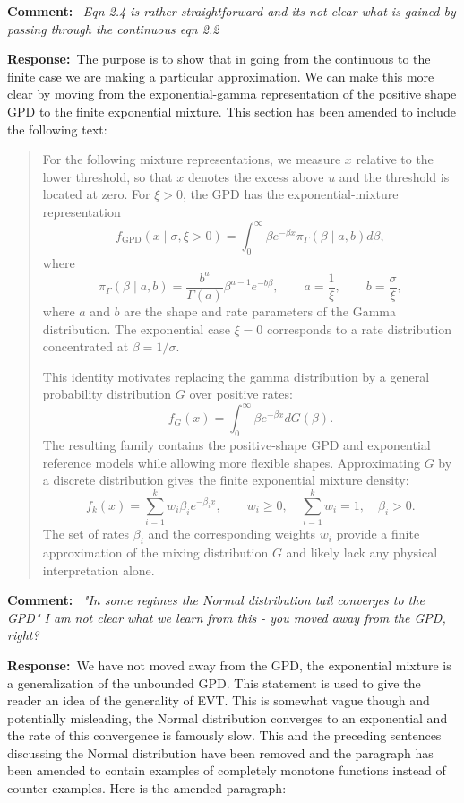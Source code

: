 \documentclass[11pt,a4paper]{article}
\newcommand{\refcomment}[1]{%
    \medskip\noindent\textbf{\color{refcolor}Comment:}\ %
    {\itshape #1}\par\smallskip
}
\newcommand{\response}{\noindent\textbf{Response:}\ }
\newcommand{\addedtext}[1]{%
    \smallskip\begin{quote}\color{quotecolor}\small #1\end{quote}\smallskip
}
\begin{document}
\refcomment{Eqn 2.4 is rather straightforward and its not clear what is gained by passing
through the continuous eqn 2.2}
\response The purpose is to show that in going from the continuous to the finite case we are making a particular approximation. We can make this more clear by moving from the exponential-gamma representation of the positive shape GPD to the finite exponential mixture. This section has been amended to include the following text:
\addedtext{For the following mixture representations, we measure $x$ relative to the lower threshold, so that $x$ denotes the excess above $u$ and the threshold is located at zero. For $\xi>0$, the GPD has the exponential-mixture representation
$$
f_{\text{GPD}}(x\mid\sigma,\xi>0)
=\int_0^\infty \beta e^{-\beta x}
\pi_\Gamma(\beta\mid a,b) d\beta,
$$
where
$$
\pi_\Gamma(\beta\mid a,b)
=\frac{b^a}{\Gamma(a)}\beta^{a-1}e^{-b\beta},
\qquad
a=\frac{1}{\xi},\qquad b=\frac{\sigma}{\xi},
$$
where $a$ and $b$ are the shape and rate parameters of the Gamma distribution. The exponential case $\xi=0$ corresponds to a rate distribution concentrated at $\beta=1/\sigma$.

This identity motivates replacing the gamma distribution by a general probability distribution $G$ over positive rates:
$$
f_G(x)=\int_0^\infty \beta e^{-\beta x} dG(\beta).
$$
The resulting family contains the positive-shape GPD and exponential reference models while allowing more flexible shapes. Approximating $G$ by a discrete distribution gives the finite exponential mixture density:
$$
f_k(x)=\sum_{i=1}^{k}w_i\beta_i e^{-\beta_i x},
\qquad
w_i\geq0,\quad \sum_{i=1}^{k}w_i=1,\quad \beta_i>0.
$$
The set of rates $\beta_i$ and the corresponding weights $w_i$ provide a finite approximation of the mixing distribution $G$ and likely lack any physical interpretation alone.}

\refcomment{"In some regimes the Normal distribution tail converges to the GPD" I am
not clear what we learn from this - you moved away from the GPD, right?}
\response We have not moved away from the GPD, the exponential mixture is a generalization of the unbounded GPD. This statement is used to give the reader an idea of the generality of EVT. This is somewhat vague though and potentially misleading, the Normal distribution converges to an exponential and the rate of this convergence is famously slow. This and the preceding sentences discussing the Normal distribution have been removed and the paragraph has been amended to contain examples of completely monotone functions instead of counter-examples. Here is the amended paragraph:
\end{document}
